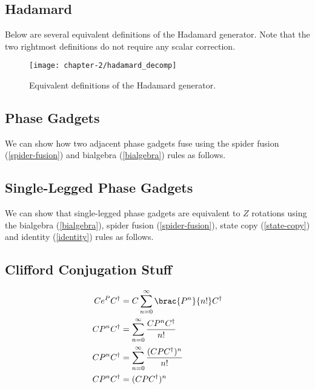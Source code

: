 \subsection{Hadamard}%
\label{appendix-hadamard}

Below are several equivalent definitions of the Hadamard generator. Note that the two rightmost definitions do not require any scalar correction.

\begin{figure}[H]
\centering
    \centering
    \texttt{[image: chapter-2/hadamard\_decomp]}
    \caption{Equivalent definitions of the Hadamard generator.}
\end{figure}


\subsection{Phase Gadgets}%
\label{appendix-phase-gadget-fusion}

We can show how two adjacent phase gadgets fuse using the spider fusion (\ref{spider-fusion}) and bialgebra (\ref{bialgebra}) rules as follows.

%


\subsection{Single-Legged Phase Gadgets}%
\label{appendix-phase-gadget-single-leg}

We can show that single-legged phase gadgets are equivalent to $Z$ rotations using the bialgebra (\ref{bialgebra}), spider fusion (\ref{spider-fusion}), state copy (\ref{state-copy}) and identity (\ref{identity}) rules as follows.



\subsection{Clifford Conjugation Stuff}%
\label{conjugation}

\begin{align*}
    Ce^PC^\dagger &= C \sum_{n=0}^\infty \brac{P^n}{n!} C^\dagger \\
    CP^nC^\dagger &= \sum_{n=0}^\infty \frac{C P^n C^\dagger}{n!} \\
    CP^nC^\dagger &= \sum_{n=0}^\infty \frac{(C P C^\dagger)^n}{n!} \\
    CP^nC^\dagger &= (CPC^\dagger)^n
\end{align*}
